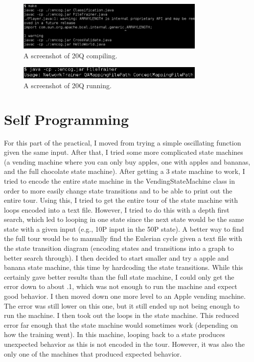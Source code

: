 \documentclass[12pt]{article}
\begin{document}
\begin{figure}
\centering
\includegraphics[width=350]{compile20q.png}
\caption{A screenshot of 20Q compiling.}
\end{figure}
\begin{figure}
\centering
\includegraphics[width=350]{run20q.png}
\caption{A screenshot of 20Q running.}
\end{figure}


\section{Self Programming}
For this part of the practical, I moved from trying a simple oscillating function given the same input. After that, I tried some more complicated state machines (a vending machine where you can only buy apples, one with apples and bananas, and the full chocolate state machine). After getting a 3 state machine to work, I tried to encode the entire state machine in the VendingStateMachine class in order to more easily change state transitions and to be able to print out the entire tour. Using this, I tried to get the entire tour of the state machine with loops encoded into a text file. However, I tried to do this with a depth first search, which led to looping in one state since the next state would be the same state with a given input (e.g., 10P input in the 50P state). A better way to find the full tour would be to manually find the Eulerian cycle given a text file with the state transition diagram (encoding states and transitions into a graph to better search through). I then decided to start smaller and try a apple and banana state machine, this time by hardcoding the state transitions. While this certainly gave better results than the full state machine, I could only get the error down to about .1, which was not enough to run the machine and expect good behavior. I then moved down one more level to an Apple vending machine. The error was still lower on this one, but it still ended up not being enough to run the machine. I then took out the loops in the state machine. This reduced error far enough that the state machine would sometimes work (depending on how the training went). In this machine, looping back to a state produces unexpected behavior as this is not encoded in the tour. However, it was also the only one of the machines that produced expected behavior.
\end{document}
